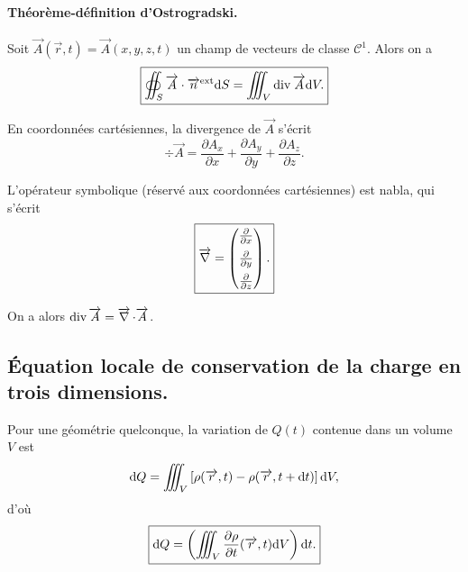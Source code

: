         \paragraph{Théorème-définition d'Ostrogradski.}

            Soit $\vec{A}(\vec{r},t)=\vec{A}(x,y,z,t)$ un champ de vecteurs de classe $\mathcal{C}^{1}$. Alors on a 
            \begin{equation*}
                \boxed{
                    \oiint_{S}\protect\overrightarrow{{A}}\cdot\protect\overrightarrow{{n}}^{\text{ext}}\mathrm{d} S=\iiint_{V}\operatorname{div}\protect\overrightarrow{{A}}\mathrm{d} V.
                }
            \end{equation*}

            En coordonnées cartésiennes, la divergence de $\vec{A}$ s'écrit 
            \begin{equation*}
                \boxed{
                    \div\vec{A}=\frac{\partial A_x}{\partial x}+\frac{\partial A_y}{\partial y}+\frac{\partial A_z}{\partial z}.
                }
            \end{equation*}

            L'opérateur symbolique (réservé aux coordonnées cartésiennes) est \og nabla\fg, qui s'écrit
            \begin{equation*}
                \boxed{
                    \operatorname{\overrightarrow{\nabla}}=\begin{pmatrix}
                        \frac{\partial}{\partial x}\\[0.2cm]
                        \frac{\partial}{\partial y}\\[0.2cm]
                        \frac{\partial}{\partial z}
                    \end{pmatrix}.
                }
            \end{equation*}

            On a alors $\operatorname{div}\protect\overrightarrow{{A}}=\operatorname{\overrightarrow{\nabla}}\cdot\protect\overrightarrow{{A}}$.

    \subsection{Équation locale de conservation de la charge en trois dimensions.}

        Pour une géométrie quelconque, la variation de $Q(t)$ contenue dans un volume $V$ est 
        \begin{equation*}
            \mathrm{d} Q=\iiint_{V}\left[\rho(\protect\overrightarrow{{r}},t)-\rho(\protect\overrightarrow{{r}},t+\mathrm{d} t)\right]\mathrm{d} V,
        \end{equation*}
        d'où 
        \begin{equation*}
            \boxed{
                \mathrm{d} Q=\left(\iiint_{V}\frac{\partial \rho}{\partial t}(\protect\overrightarrow{{r}},t)\mathrm{d} V\right)\mathrm{d} t.
            }
        \end{equation*}


